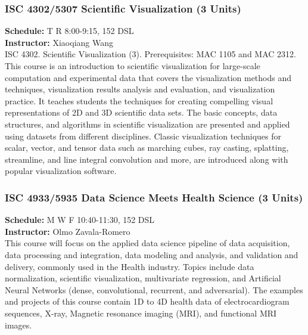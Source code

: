 \documentclass[12pt,a4paper]{article}
\begin{document}
\subsubsection*{ISC 4302/5307 Scientific Visualization (3 Units)}
\textbf{Schedule:} T R 8:00-9:15, 152 DSL \\
\textbf{Instructor:} Xiaoqiang Wang \\
ISC 4302. Scientific Visualization (3). Prerequisites: MAC 1105 and MAC 2312. This course is an introduction to scientific visualization for large-scale computation and experimental data that covers the visualization methods and techniques, visualization results analysis and evaluation, and visualization practice. It teaches students the techniques for creating compelling visual representations of 2D and 3D scientific data sets. The basic concepts, data structures, and algorithms in scientific visualization are presented and applied using datasets from different disciplines. Classic visualization techniques for scalar, vector, and tensor data such as marching cubes, ray casting, splatting, streamline, and line integral convolution and more, are introduced along with popular visualization software.

\subsubsection*{ISC 4933/5935 Data Science Meets Health Science (3 Units)}
\textbf{Schedule:} M W F 10:40-11:30, 152 DSL \\
\textbf{Instructor:} Olmo Zavala-Romero \\
This course will focus on the applied data science pipeline of data acquisition, data processing and integration, data modeling and analysis, and validation and delivery, commonly used in the Health industry. Topics include data normalization, scientific visualization, multivariate regression, and Artificial Neural Networks (dense, convolutional, recurrent, and adversarial). The examples and projects of this course contain 1D to 4D health data of electrocardiogram sequences, X-ray, Magnetic resonance imaging (MRI), and functional MRI images.
\end{document}

